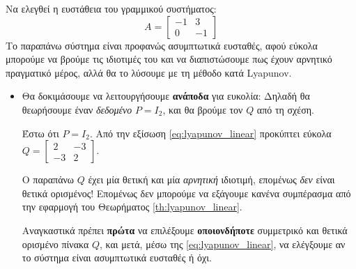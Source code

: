 \documentclass[11pt,a4paper,notitlepage,fleqn]{article}
\begin{document}
\begin{exercise}[Παράδειγμα]
	Να ελεγθεί η ευστάθεια του γραμμικού συστήματος:
	\[
	A = \left[
	\begin{matrix}
	-1 & 3 \\ 0 & -1
	\end{matrix}\right]
	\]
	\tcblower
	Το παραπάνω σύστημα είναι προφανώς ασυμπτωτικά ευσταθές,
	αφού εύκολα μπορούμε να βρούμε τις ιδιοτιμές του και να διαπιστώσουμε πως έχουν
	αρνητικό πραγματικό μέρος,
    αλλά θα το λύσουμε με τη μέθοδο κατά Lyapunov.
    
    \begin{itemize}
    \item	Θα δοκιμάσουμε να λειτουργήσουμε \textbf{ανάποδα} για ευκολία:
    	Δηλαδή θα θεωρήσουμε έναν \textit{δεδομένο} \( P=I_2 \), και
    	θα βρούμε τον \( Q \) από τη σχέση.
    	
    	Έστω ότι \( P = I_2 \). Από την εξίσωση \eqref{eq:lyapunov_linear}
    	προκύπτει εύκολα \( Q = \left[\begin{matrix}
    	2 & -3 \\ -3 & 2
    	\end{matrix}\right] \).
    	
    	Ο παραπάνω \( Q \) έχει μία θετική και μία \textit{αρνητική}
    	ιδιοτιμή, επομένως \textit{δεν} είναι θετικά ορισμένος! Επομένως
    	δεν μπορούμε να εξάγουμε κανένα συμπέρασμα από την εφαρμογή
    	του Θεωρήματος \ref{th:lyapunov_linear}.
    	
    	Αναγκαστικά πρέπει \textbf{πρώτα} να επιλέξουμε \textbf{οποιονδήποτε} συμμετρικό και θετικά ορισμένο πίνακα
    	\( Q \), και μετά, μέσω της \eqref{eq:lyapunov_linear}, να
    	ελέγξουμε αν το σύστημα είναι ασυμπτωτικά ευσταθές ή όχι.
    \end{itemize}
\end{exercise}
\end{document}
